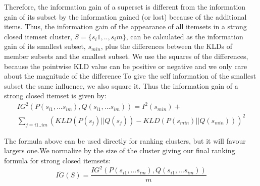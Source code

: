 \documentclass{sig-alternate}
\begin{document}
Therefore, the information gain of a superset is different from the information gain of its subset by the information gained (or lost) because of the additional items. Thus, the information gain of the appearance of all itemsets in a strong closed itemset cluster, $S=\{s_i1,..,s_im\}$, 
can be calculated as the information gain of its smallest subset, $s_{min}$, plus the differences between the KLDs of member subsets and the smallest subset. We use the squares of the differences, because the pointwise KLD value can be positive or negative and we only care about the magnitude of the difference
To give the self information of the smallest subset the same influence, we also square it. Thus the information gain of a strong closed itemset is given by:
\begin{multline*}IG^2(P(s_{i1},...s_{im}),Q(s_{i1},...s_{im})) = I^2(s_{min}) + \\ %
\sum_{j = i1..im}{(KLD(P(s_j)||Q(s_j)) - KLD(P(s_{min})||Q(s_{min})))^{2}} \end{multline*}

The formula above can be used directly for ranking clusters, but it will favour largers one.We normalize by the size of the cluster giving our final ranking formula for strong closed itemsets:
\begin{equation}\label{eq:avgIG}\overline{IG}(S) = \frac{IG^2(P(s_{i1},...s_{im}),Q(s_{i1},...s_{im}))}{m}\end{equation}


\end{document}
